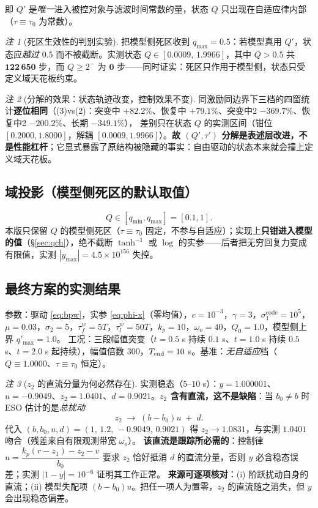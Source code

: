 \documentclass[11pt,a4paper]{article}
\theoremstyle{remark}\newtheorem{remark}{注}
\newcommand{\ath}{\operatorname{tanh}^{-1}}
\begin{document}
即 $Q'$ 是\emph{唯一}进入被控对象与滤波时间常数的量，状态 $Q$ 只出现在自适应律内部（$\tau\equiv\tau_0$ 为常数）。
\begin{remark}[死区生效性的判别实验]\label{rem:deadzone-proof}
把模型侧死区收到 $q_{\max}=0.5$：若模型真用 $Q'$，状态应\emph{越过} $0.5$ 而不被截断。实测状态 $Q\in[0.0009,\,1.9966]$，其中 $Q>0.5$ 共 $\mathbf{122\,650}$ 步，而 $Q\ge2^{-}$ 为 $\mathbf{0}$ 步——同时证实：死区只作用于模型侧，状态只受定义域天花板约束。
\end{remark}
\begin{remark}[分解的效果：状态轨迹改变，控制效果不变]\label{rem:decouple-effect}
同激励同边界下三档的四窗统计\textbf{逐位相同}（(3)vs(2)：突变中 $+82.2\%$、恢复中 $+79.1\%$、突变中2 $-369.7\%$、恢复中2 $-200.2\%$、长期 $-349.1\%$），
差别只在状态 $Q$ 的实测区间（钳位 $[0.2000,1.8000]$，解耦 $[0.0009,1.9966]$）。\textbf{故 $(Q',\tau')$ 分解是表述层改进，不是性能杠杆}；它显式暴露了原结构被隐藏的事实：自由驱动的状态本来就会撞上定义域天花板。
\end{remark}
\subsection{域投影（模型侧死区的默认取值）}\label{sec:proj-old}
\begin{equation}
  Q\in[q_{\min},q_{\max}]=[0.1, 1].
  \label{eq:proj}
\end{equation}
本版只保留 $Q$ 的模型侧死区（$\tau\equiv\tau_0$ 固定，不参与自适应）；实现上\textbf{只钳进入模型的值}（\S\ref{sec:qch}），绝不截断 $\ath$ 或 $\log$ 的实参——后者把无穷回复力变成有限值，实测 $|y_{\max}|=4.5\times10^{156}$ 失控。
\subsection{最终方案的实测结果}\label{sec:bpw-result}
参数：驱动 \eqref{eq:bpw}，实参 \eqref{eq:phi-x}（零均值），$c=10^{-3}$，$\gamma=3$，$\sigma_1^{\mathrm{code}}=10^{5}$，$\mu=0.03$，$\sigma_2=5$，$\tau_f^{w}=5T$，$\tau_l^{w}=50T$，$k_p=10$，$\omega_o=40$，$Q_0=1.0$，模型侧上界 $q'_{\max}=1.0$。
工况：三段幅值突变（$t=0.5$ s 持续 $0.1$ s、$t=1.0$ s 持续 $0.5$ s、$t=2.0$ s 起持续），幅值倍数 $300$，$T_{\rm end}=10$ s。基准：\emph{无自适应}档（$Q\equiv1.0000$、$\tau\equiv\tau_0$ 恒定）。
\begin{remark}[$z_2$ 的直流分量为何必然存在]\label{rem:z2dc}
实测稳态（$5$--$10$ s）：$y=1.000001$、$u=-0.9049$、$z_2=1.0401$、$d=0.9021$。\textbf{$z_2$ 含有直流，这不是缺陷}：当 $b_0\ne b$ 时 ESO 估计的是\emph{总扰动}
\begin{equation}
  z_2\;\longrightarrow\;(b-b_0) u\;+\;d .
  \label{eq:z2dc}
\end{equation}
代入 $(b,b_0,u,d)=(1,\,1.2,\,-0.9049,\,0.9021)$ 得 $z_2\to1.0831$，与实测 $1.0401$ 吻合（残差来自有限观测带宽 $\omega_o$）。
\textbf{该直流是跟踪所必需的}：控制律 $u=\dfrac{k_p(r-z_1)-z_2-v}{b_0}$ 要求 $z_2$ 恰好抵消 $d$ 的直流分量，否则 $y$ 必含稳态误差；实测 $|1-y|=10^{-6}$ 证明其工作正常。
\textbf{来源可逐项核对}：(i) 阶跃扰动自身的直流；(ii) 模型失配项 $(b-b_0)u$。把任一项人为置零，$z_2$ 的直流随之消失，但 $y$ 会出现稳态偏差。
\end{remark}
\end{document}
